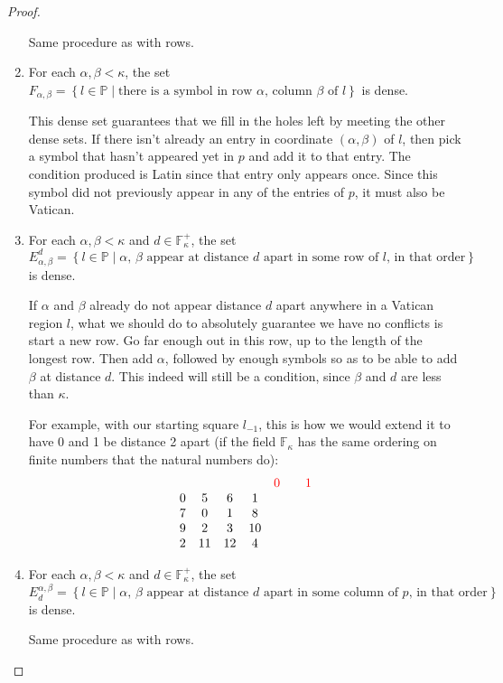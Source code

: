 \documentclass[12pt,a4paper]{article}
\newcommand{\F}{\mathbb{F}}
\newcommand{\st}{\; | \;}
\newcommand{\set}[2]{\left\{#1\st #2 \right\}}
\renewcommand{\P}{\mathbb{P}}
\begin{document}
\begin{proof}
\begin{enumerate}
	Same procedure as with rows.	
	
	\item For each $\alpha, \beta < \kappa$, the set $F_{\alpha, \beta}=\set{l \in \P}{\text{there is a symbol in row $\alpha$, column $\beta$ of $l$}}$ is dense.
	
	This dense set guarantees that we fill in the holes left by meeting the other dense sets. If there isn't already an entry in coordinate $(\alpha, \beta)$ of $l$, then pick a symbol that hasn't appeared yet in $p$ and add it to that entry. The condition produced is Latin since that entry only appears once. Since this symbol did not previously appear in any of the entries of $p$, it must also be Vatican.
	
	\item For each $\alpha, \beta<\kappa$ and $d \in \F_\kappa^+$, the set $$E^d_{\alpha, \beta}=\set{l \in \P}{\text{$\alpha$, $\beta$ appear at distance $d$ apart in some row of $l$, in that order}}$$ is dense.
	
	If $\alpha$ and $\beta$ already do not appear distance $d$ apart anywhere in a Vatican region $l$, what we should do to absolutely guarantee we have no conflicts is start a new row. Go far enough out in this row, up to the length of the longest row. Then add $\alpha$, followed by enough symbols so as to be able to add $\beta$ at distance $d$. This indeed will still be a condition, since $\beta$ and $d$ are less than $\kappa$.
	
	For example, with our starting square $l_{-1}$, this is how we would extend it to have 0 and 1 be distance 2 apart (if the field $\F_\kappa$ has the same ordering on finite numbers that the natural numbers do):
$$\begin{array}{ccccccc}
	& & & & \color{red}0 & &\color{red}1\\
	0 & 5 & 6 & 1 \\ 
	7 &  0 & 1 & 8  \\
	9 & 2 & 3 & 10 \\
	2 & 11 & 12 & 4 
\end{array}$$
	
	\item For each $\alpha, \beta<\kappa$ and $d \in \F_\kappa^+$, the set $$E_d^{\alpha, \beta}=\set{l \in \P}{\text{$\alpha$, $\beta$ appear at distance $d$ apart in some column of $p$, in that order}}$$ is dense.
	
	Same procedure as with rows.
	

\end{enumerate}


\end{proof}
\end{document}

